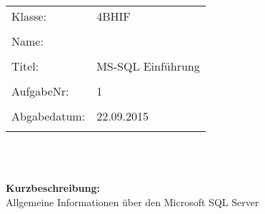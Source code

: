 \setlength{\parindent}{0em}
\begin{titlepage}
	\LARGE
	\begin{tabular}{ll}
		Klasse:&4BHIF\\\\
		Name:&\\\\
		Titel:&MS-SQL Einführung\\\\
		AufgabeNr:&1\\\\
		Abgabedatum:&22.09.2015\\\\
	\end{tabular}\\\\
	
	\vspace{2cm}
	
	\Large
	\textbf{Kurzbeschreibung:}\\
	\large
	Allgemeine Informationen über den Microsoft SQL Server
\end{titlepage}


